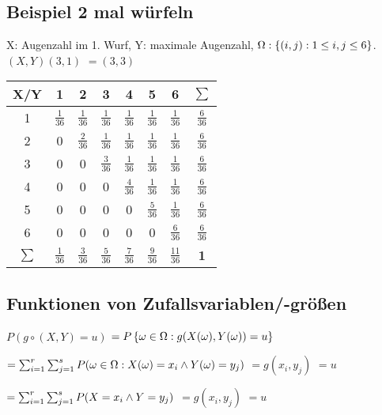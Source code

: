 \renewcommand{\ldate}{2015-11-24}

\subsection{Beispiel 2 mal würfeln}
X: Augenzahl im 1. Wurf, Y: maximale Augenzahl, $\Omega:  \left\lbrace (i,j):1\leq i,j \leq 6 \right\rbrace $. 
$(X,Y)(3,1)$
$=(3,3) $

\begin{tabular}{|c|c|c|c|c|c|c|c|}
\hline X/Y & 1 & 2 & 3 & 4 & 5 & 6 & $\sum$\\ 
\hline 1 & $ \frac{1}{36} $ & $ \frac{1}{36} $ & $ \frac{1}{36} $ & $ \frac{1}{36} $ & $ \frac{1}{36} $ & $ \frac{1}{36} $ & $ \frac{6}{36}$\\ 
\hline 2 & 0 & $ \frac{2}{36} $ & $ \frac{1}{36} $ & $ \frac{1}{36} $ & $ \frac{1}{36} $ & $ \frac{1}{36} $ & $ \frac{6}{36}$ \\ 
\hline 3 & 0 & 0 & $ \frac{3}{36} $ & $ \frac{1}{36} $ & $ \frac{1}{36} $ & $ \frac{1}{36} $ & $ \frac{6}{36}$ \\ 
\hline 4 & 0 & 0 & 0 & $ \frac{4}{36} $ & $ \frac{1}{36} $ & $ \frac{1}{36} $ & $ \frac{6}{36}$ \\ 
\hline 5 & 0 & 0 & 0 & 0 & $ \frac{5}{36} $ & $ \frac{1}{36} $ & $ \frac{6}{36}$ \\ 
\hline 6 & 0 & 0 & 0 & 0 & 0 & $ \frac{6}{36} $ & $ \frac{6}{36}$ \\ 
\hline $\sum$ & $ \frac{1}{36}$ & $ \frac{3}{36}$ & $ \frac{5}{36}$ & $ \frac{7}{36}$ & $ \frac{9}{36}$ & $ \frac{11}{36}$ & \textbf{1} \\
\hline 
\end{tabular} 


\subsection{Funktionen von Zufallsvariablen/-größen}

$P(g\circ (X,Y) = u) $
$= P \left\lbrace \omega\in\Omega : g(X(\omega),Y(\omega))=u \right\rbrace  $

$=\sum_{i=1}^{r} \sum_{j=1}^{s} P(\omega\in\Omega: X(\omega)=x_i \wedge Y(\omega)=y_j)$
$=g(x_i,y_j)$
$=u$

$=\sum_{i=1}^{r} \sum_{j=1}^{s} P(X=x_i \wedge Y=y_j)$
$=g(x_i,y_j)$
$=u$

